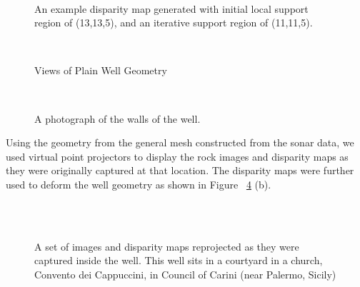 \documentclass[twocolumn]{article}
\begin{document}
\begin{figure}[!h]
	\centering
		\quad %
		\\%
		\medskip
		\caption{An example disparity map generated with initial local support region of (13,13,5), and an iterative support region of (11,11,5).}
		\label{fig:disparity}
\end{figure}


\begin{figure}[!h]
	\centering
		\quad %
		\\%

		\caption{Views of Plain Well Geometry}
		\label{fig:wellNoFine}
\end{figure}

\begin{figure}[!h]
	\centering
		\\%

		\caption{ A photograph of the walls of the well.}
		\label{fig:wellPhoto}
\end{figure}

Using the geometry from the general mesh constructed from the sonar data, we used virtual point projectors to display the rock images and disparity maps as they were originally captured at that location.  
The disparity maps were further used to deform the well geometry as shown in Figure ~\ref{fig:result2} (b).

\begin{figure}[!h]
	\centering
		\\
		\quad %
			\\		
	
		\caption{A set of images and disparity maps reprojected as they were captured inside the well. This well sits in a courtyard in a church, Convento dei Cappuccini, in Council of Carini (near Palermo, Sicily)}
		\label{fig:result2}
\end{figure}
\end{document}
